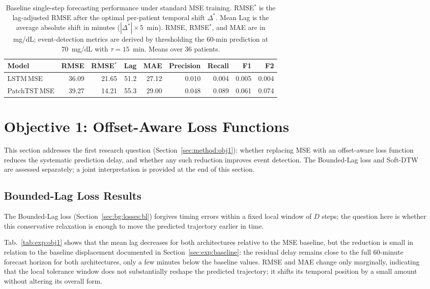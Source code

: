 \begin{table}[tbp]
\centering
\small
\caption{Baseline single-step forecasting performance under standard MSE training. RMSE$^*$ is the lag-adjusted RMSE after the optimal per-patient temporal shift $\Delta^*$. Mean Lag is the average absolute shift in minutes ($|\Delta^*| \times 5$~min). RMSE, RMSE$^*$, and MAE are in mg/dL; event-detection metrics are derived by thresholding the 60-min prediction at 70~mg/dL with $\tau = 15$~min. Means over 36 patients.}
\label{tab:exp:baseline}
\setlength{\tabcolsep}{5pt}
\begin{tabular}{lrrrrrrrr}
\toprule
Model & RMSE & RMSE$^*$ & Lag & MAE & Precision & Recall & F1 & F2 \\
\midrule
LSTM\,MSE      & 36.09 & 21.65 & 51.2 & 27.12 & 0.010 & 0.004 & 0.005 & 0.004 \\
PatchTST\,MSE  & 39.27 & 14.21 & 55.3 & 29.00 & 0.048 & 0.089 & 0.061 & 0.074 \\
\bottomrule
\end{tabular}
\end{table}

\section{Objective 1: Offset-Aware Loss Functions} \label{sec:exp:obj1}

This section addresses the first research question (Section~\ref{sec:method:obj1}): whether replacing MSE with an offset-aware loss function reduces the systematic prediction delay, and whether any such reduction improves event detection. The Bounded-Lag loss and Soft-DTW are assessed separately; a joint interpretation is provided at the end of this section.

\subsection{Bounded-Lag Loss Results}

The Bounded-Lag loss (Section~\ref{sec:bg:losses:bl}) forgives timing errors within a fixed local window of $D$ steps; the question here is whether this conservative relaxation is enough to move the predicted trajectory earlier in time.

Tab.~\ref{tab:exp:obj1} shows that the mean lag decreases for both architectures relative to the MSE baseline, but the reduction is small in relation to the baseline displacement documented in Section~\ref{sec:exp:baseline}: the residual delay remains close to the full 60-minute forecast horizon for both architectures, only a few minutes below the baseline values. RMSE and MAE change only marginally, indicating that the local tolerance window does not substantially reshape the predicted trajectory; it shifts its temporal position by a small amount without altering its overall form.

